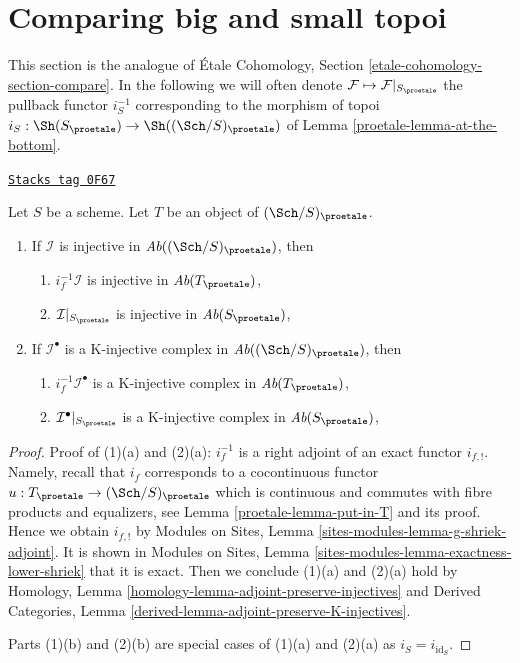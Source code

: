 \section{Comparing big and small topoi}
\label{proetale-section-compare}
This section is the analogue of \'Etale Cohomology, Section
\ref{etale-cohomology-section-compare}. In the following we
will often denote $\mathcal{F} \mapsto \mathcal{F}|_{S_\proetale}$
the pullback functor $i_S^{-1}$ corresponding to
the morphism of topoi $i_S : \Sh(S_\proetale) \to \Sh((\Sch/S)_\proetale)$
of Lemma \ref{proetale-lemma-at-the-bottom}.

\begin{lemma}
\label{proetale-lemma-compare-injectives}
\href{https://stacks.math.columbia.edu/tag/0F67}{\texttt{Stacks tag 0F67}}

Let $S$ be a scheme. Let $T$ be an object of $(\Sch/S)_\proetale$.
\begin{enumerate}
\item If $\mathcal{I}$ is injective in $\textit{Ab}((\Sch/S)_\proetale)$, then
\begin{enumerate}
\item $i_f^{-1}\mathcal{I}$ is injective in $\textit{Ab}(T_\proetale)$,
\item $\mathcal{I}|_{S_\proetale}$ is injective in $\textit{Ab}(S_\proetale)$,
\end{enumerate}
\item If $\mathcal{I}^\bullet$ is a K-injective complex
in $\textit{Ab}((\Sch/S)_\proetale)$, then
\begin{enumerate}
\item $i_f^{-1}\mathcal{I}^\bullet$ is a K-injective complex in
$\textit{Ab}(T_\proetale)$,
\item $\mathcal{I}^\bullet|_{S_\proetale}$ is a K-injective complex in
$\textit{Ab}(S_\proetale)$,
\end{enumerate}
\end{enumerate}
\end{lemma}

\begin{proof}

Proof of (1)(a) and (2)(a): $i_f^{-1}$ is a right adjoint of an
exact functor $i_{f, !}$. Namely, recall that $i_f$ corresponds
to a cocontinuous functor $u : T_\proetale \to (\Sch/S)_\proetale$
which is continuous and commutes with fibre products and equalizers, see
Lemma \ref{proetale-lemma-put-in-T} and its proof. Hence we obtain $i_{f, !}$ by
Modules on Sites, Lemma \ref{sites-modules-lemma-g-shriek-adjoint}.
It is shown in Modules on Sites, Lemma
\ref{sites-modules-lemma-exactness-lower-shriek} that it is exact.
Then we conclude (1)(a) and (2)(a) hold by
Homology, Lemma \ref{homology-lemma-adjoint-preserve-injectives} and
Derived Categories, Lemma \ref{derived-lemma-adjoint-preserve-K-injectives}.

\medskip\noindent
Parts (1)(b) and (2)(b) are special cases of (1)(a) and (2)(a)
as $i_S = i_{\text{id}_S}$.
\end{proof}

